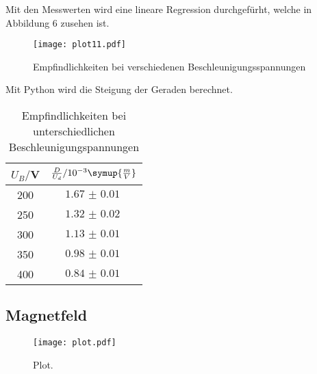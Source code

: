 Mit den Messwerten wird eine lineare Regression durchgefürht, welche in Abbildung 6 zusehen ist.

\begin{figure}
  \centering
  \texttt{[image: plot11.pdf]}
  \caption{Empfindlichkeiten bei verschiedenen Beschleunigungsspannungen}
  \label{fig:plot}
\end{figure}

Mit Python wird die Steigung der Geraden berechnet. \\

\begin{table}[H]
  \centering
  \caption{Empfindlichkeiten bei unterschiedlichen Beschleunigungspannungen}
  \label{tab:Spannungsamplitude}
  \begin{tabular}{c c}
    \toprule
    $U_B/$V & $\frac{D}{U_d} / 10^{-3}\symup{\frac{m}{V}}$ \\
    \midrule
    200 & $\SI{1.67(1)}{}$ \\
    250 & $\SI{1.32(2)}{}$ \\
    300 & $\SI{1.13(1)}{}$ \\
    350 & $\SI{0.98(1)}{}$ \\
    400 & $\SI{0.84(1)}{}$ \\
    \bottomrule
  \end{tabular}
\end{table}



\subsection{Magnetfeld}

\begin{figure}
  \centering
  \texttt{[image: plot.pdf]}
  \caption{Plot.}
  \label{fig:plot}
\end{figure}
